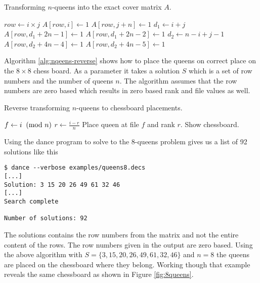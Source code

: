 \begin{algorithm}[H]
	\caption{Transforming $n$-queens into the exact cover matrix $A$.}
	\label{alg:nqeens-cover}
	\begin{distribalgo}[1]
					\STATE $row \leftarrow i \times j$
					\STATE $A[row,i] \leftarrow 1$  
					\STATE $A[row,j+n] \leftarrow 1$  
					\STATE $d_1 \leftarrow i + j$  
							\STATE $A[row,d_1 + 2n - 1] \leftarrow 1$
						\ELSE
							\STATE $A[row,d_1 + 2n - 2] \leftarrow 1$
						\ENDIF
					\ENDIF
					\STATE $d_2 \leftarrow n - i + j - 1$  
							\STATE $A[row,d_2 + 4n - 4] \leftarrow 1$
						\ELSE
							\STATE $A[row,d_2 + 4n - 5] \leftarrow 1$
						\ENDIF
					\ENDIF
				\ENDFOR
			\ENDFOR
		\ENDPROC
	\end{distribalgo}
\end{algorithm}

Algorithm \ref{alg:nqeens-reverse} shows how to place the queens on correct place on the $8 \times 8$ chess board.
As a parameter it takes a solution $S$ which is a set of row numbers and the number of queens $n$.
The algorithm assumes that the row numbers are zero based which results in zero based rank and file values as well.
\begin{algorithm}[H]
	\caption{Reverse transforming $n$-queens to chessboard placements.}
	\label{alg:nqeens-reverse}
	\begin{distribalgo}[1]
				\STATE $f \leftarrow i \imod n$
				\STATE $r \leftarrow \frac{i - r}{n}$
				\STATE Place queen at file $f$ and rank $r$.
			\ENDFOR
			\STATE Show chessboard.
		\ENDPROC
	\end{distribalgo}
\end{algorithm}

\begin{example}
Using the dance program to solve to the 8-queens problem gives us a list of 92 solutions like this
\begin{verbatim}
$ dance --verbose examples/queens8.decs
[...]
Solution: 3 15 20 26 49 61 32 46
[...]
Search complete

Number of solutions: 92
\end{verbatim}
The solutions contains the row numbers from the matrix and not the entire content of the rows.
The row numbers given in the output are zero based.
Using the above algorithm with $S = \{3, 15, 20, 26, 49, 61, 32, 46\}$ and $n = 8$ the queens are placed on the chessboard where they belong.
Working though that example reveals the same chessboard as shown in Figure \ref{fig:8queens}.
\end{example}




